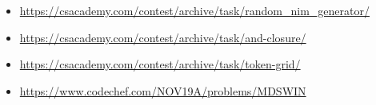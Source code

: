 \begin{itemize}
 
    \item \href{https://csacademy.com/contest/archive/task/random_nim_generator/}{https://csacademy.com/contest/archive/task/random\_nim\_generator/}

    \item \href{https://csacademy.com/contest/archive/task/and-closure/}{https://csacademy.com/contest/archive/task/and-closure/}

    \item \href{https://csacademy.com/contest/archive/task/token-grid/}{https://csacademy.com/contest/archive/task/token-grid/}

    \item \href{https://www.codechef.com/NOV19A/problems/MDSWIN}{https://www.codechef.com/NOV19A/problems/MDSWIN}   
\end{itemize}

